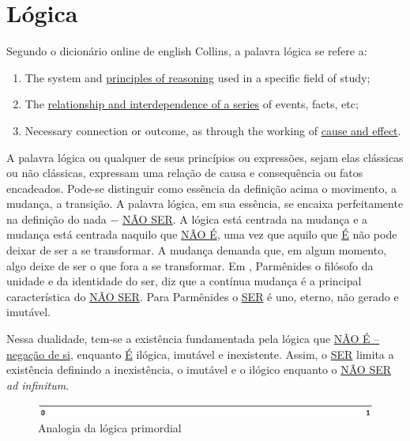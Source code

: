 \section{Lógica}
Segundo o dicionário online de english Collins\cite{dicio_logica}, a palavra lógica se refere a:
	\begin{enumerate}
	   \item The system and \underline{principles of reasoning} used in a specific field of study;
	   \item The \underline{relationship and interdependence of a series} of events, facts, etc; 
	   \item Necessary connection or outcome, as through the working of \underline{cause and effect}. 
	\end{enumerate}
 
\bigbreak
A palavra lógica ou qualquer de seus princípios ou expressões, sejam elas clássicas ou não clássicas, expressam uma relação de causa e consequência ou fatos encadeados. Pode-se distinguir como essência da definição acima o movimento, a mudança, a transição. A palavra lógica, em sua essência, se encaixa perfeitamente na definição do nada − \underline{NÃO SER}. A lógica está centrada na mudança e a mudança está centrada naquilo que \underline{NÃO É}, uma vez que aquilo que \underline{É} não pode deixar de ser a se transformar. A mudança demanda que, em algum momento, algo deixe de ser o que fora a se transformar. Em , Parmênides  o filósofo da unidade e da identidade do ser, diz que a contínua mudança é a principal característica do \underline{NÃO SER}. Para Parmênides o \underline{SER} é uno, eterno, não gerado e imutável.

Nessa dualidade, tem-se a existência fundamentada pela lógica que \underline{NÃO É – negação de si}, enquanto \underline{É} ilógica, imutável e inexistente. Assim, o \underline{SER} limita a existência definindo a inexistência, o imutável e o ilógico enquanto o \underline{NÃO SER} \textit{ad infinitum}.
	\begin{figure}[H]
	\caption{Analogia da lógica primordial}
	\label{fig:primordial_logic_representation}
	\centering
	\includegraphics[scale=.9]{sections/images/primordial_logic_representation.jpg}
	\end{figure}

